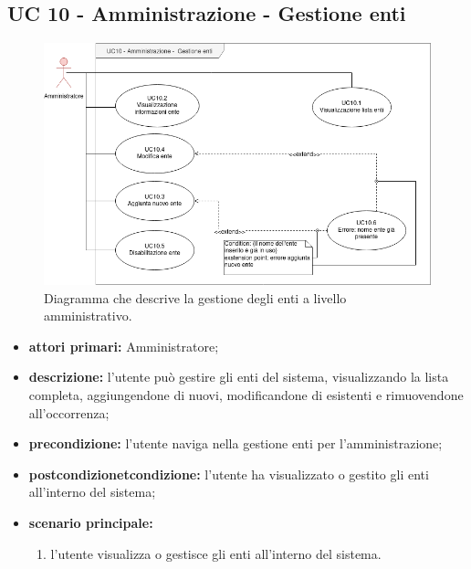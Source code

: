 \subsection{UC 10 - Amministrazione - Gestione enti}

		\begin{figure}[H]
			\centering
			\includegraphics[scale=0.60]{res/images/uc10}
			\caption{Diagramma che descrive la gestione degli enti a livello amministrativo.}
		\end{figure}

		\begin{itemize}
			\item \textbf{attori primari:} Amministratore;
			\item \textbf{descrizione:} l'utente può gestire gli enti del sistema, visualizzando la lista completa, aggiungendone di nuovi, modificandone di esistenti e rimuovendone all'occorrenza;
			\item \textbf{precondizione:} l'utente naviga nella gestione enti per l'amministrazione;
			\item \textbf{postcondizionetcondizione:} l'utente ha visualizzato o gestito gli enti all'interno del sistema;
			\item \textbf{scenario principale:}
			\begin{enumerate}
				\item{l'utente visualizza o gestisce gli enti all'interno del sistema.}
			\end{enumerate}	
		\end{itemize}

